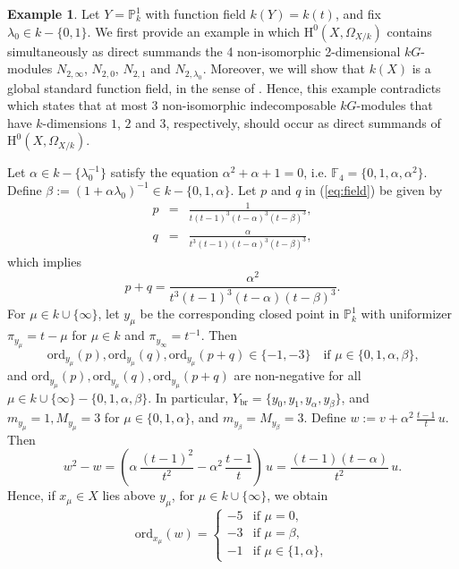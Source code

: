 \documentclass{amsart}
\numberwithin{equation}{section}
\numberwithin{table}{section}
\theoremstyle{plain}
\theoremstyle{definition}
\newtheorem{example}[theorem]{Example}
\theoremstyle{remark}
\newcommand{\HH}{\mathrm{H}}
\begin{document}
\begin{example}
\label{ex:oops1}
Let $Y=\mathbb{P}^1_k$ with function field $k(Y)=k(t)$, and fix $\lambda_0\in k-\{0,1\}$. We first provide an example in which $\HH^0(X,\Omega_{X/k})$ contains simultaneously as direct summands the 4 non-isomorphic 2-dimensional $kG$-modules $N_{2,\infty}$, $N_{2,0}$, $N_{2,1}$ and $N_{2,\lambda_0}$. Moreover, we will show that $k(X)$ is a global standard function field, in the sense of \cite[Definitions 2.1 and 3.1]{MarquesWard2018}. Hence, this example contradicts \cite[Theorem 6.4]{MarquesWard2018} which states that at most $3$ non-isomorphic indecomposable $kG$-modules that have $k$-dimensions $1$, $2$ and $3$, respectively, should occur as direct summands of $\HH^0(X,\Omega_{X/k})$.

Let $\alpha \in k-\{\lambda_0^{-1}\}$ satisfy the equation $\alpha^2+\alpha+1=0$, i.e. $\mathbb{F}_4=\{0,1,\alpha,\alpha^2\}$. Define $\beta:=(1+\alpha\lambda_0)^{-1}\in k-\{0,1,\alpha\}$. Let $p$ and $q$ in (\ref{eq:field}) be given by
\begin{eqnarray*}
p&=&\frac{1}{t(t-1)^3(t-\alpha)^3(t-\beta)^3},\\
q&=&\frac{\alpha}{t^3(t-1)(t-\alpha)^3(t-\beta)^3} ,
\end{eqnarray*}
which implies
$$p+q
=\frac{\alpha^2}{t^3(t-1)^3(t-\alpha)(t-\beta)^3}.$$
For $\mu\in k\cup\{\infty\}$, let $y_\mu$ be the corresponding closed point in $\mathbb{P}^1_k$ with uniformizer $\pi_{y_\mu}=t-\mu$ for $\mu\in k$ and $\pi_{y_\infty} = t^{-1}$. Then
$$\mathrm{ord}_{y_\mu}(p), \mathrm{ord}_{y_\mu}(q), \mathrm{ord}_{y_\mu}(p+q)\in \{-1,-3\}\quad
\mbox{if $\mu\in 
\{0,1,\alpha,\beta\}
$,}$$
and $\mathrm{ord}_{y_\mu}(p), \mathrm{ord}_{y_\mu}(q), \mathrm{ord}_{y_\mu}(p+q)$ are non-negative for all 
$\mu \in k\cup\{\infty\}-\{0,1,\alpha,\beta\}$.
In particular, $Y_{\mathrm{br}} = \{y_0,y_1,y_\alpha,y_{\beta}\}$, and $m_{y_\mu}=1,M_{y_\mu}=3$ for $\mu\in\{0,1,\alpha\}$, and $m_{y_{\beta}}=M_{y_{\beta}}=3$. Define $w:=v+  \alpha^2\,\frac{t-1}{t} \,u$. Then 
$$w^2 - w = 
\left(\alpha\,\frac{(t-1)^2}{t^2} - \alpha^2\,\frac{t-1}{t} \right)\, u
= \frac{(t-1)(t-\alpha)}{t^2}\,u.$$
Hence, if $x_\mu\in X$ lies above $y_\mu$, for $\mu\in k\cup\{\infty\}$, we obtain 
$$\mathrm{ord}_{x_\mu}(w) = \left\{\begin{array}{cl} -5 & \mbox{if } \mu=0,\\ -3 & \mbox{if } \mu=\beta,\\ -1 & \mbox{if } \mu\in\{1,\alpha\},\end{array}\right. $$

\end{example}
\end{document}
